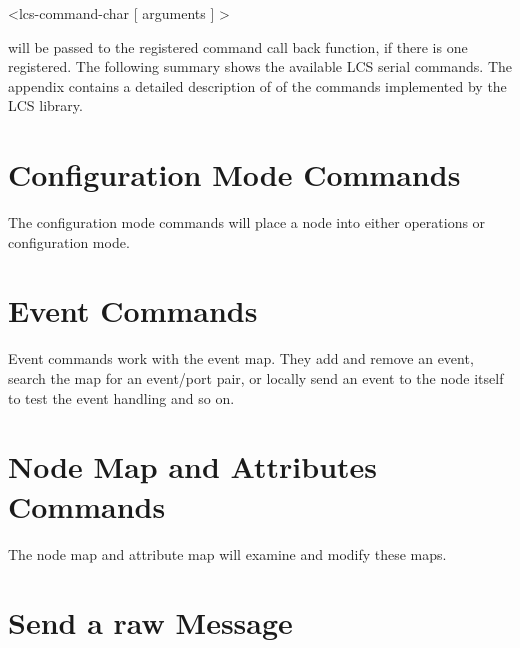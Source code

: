 <lcs-command-char [ arguments ] >


will be passed to the registered command call back function, if there is one registered. The following summary shows the available LCS serial commands. The appendix contains a detailed description of of the commands implemented by the LCS library.

\section{Configuration Mode Commands}

The configuration mode commands will place a node into either operations or configuration mode.


\section{Event Commands}

Event commands work with the event map. They add and remove an event, search the map for an event/port pair, or locally send an event to the node itself to test the event handling and so on.


\section{Node Map and Attributes Commands}

The node map and attribute map will examine and modify these maps.


\section{Send a raw Message}


